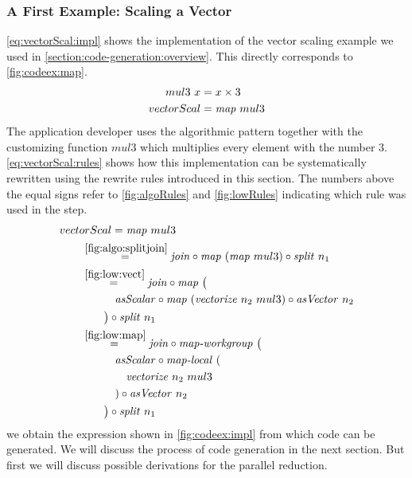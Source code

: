 \subsubsection{A First Example: Scaling a Vector}
\autoref{eq:vectorScal:impl} shows the implementation of the vector scaling example we used in \autoref{section:code-generation:overview}.
This directly corresponds to \autoref{fig:codeex:map}.
\begin{align}
  mul3\ x &= x \times 3\nonumber\\
  vectorScal &= \text{\textit{map}}\ mul3
  \label{eq:vectorScal:impl}
\end{align}
The application developer uses the algorithmic pattern \map together with the customizing function $mul3$ which multiplies every element with the number $3$.
\autoref{eq:vectorScal:rules} shows how this implementation can be systematically rewritten using the rewrite rules introduced in this section.
The numbers above the equal signs refer to \autoref{fig:algoRules} and \autoref{fig:lowRules} indicating which rule was used in the step.
\begin{align}
  &vectorScal = \text{\textit{map}}\ mul3\nonumber\\
  &\qquad\begin{aligned}
    &\overset{\ref{fig:algo:splitjoin}}{=\hspace{.2em}}
      \text{\textit{join}} \circ \text{\textit{map}}\ (\text{\textit{map}}\ mul3) \circ \text{\textit{split}}\ n_1\\
    &\overset{\ref{fig:low:vect}}{=\hspace{.2em}}
      \text{\textit{join}} \circ \text{\textit{map}}\ \big(\\
      &\qquad\quad \text{\textit{asScalar}} \circ \text{\textit{map}}\ (\text{\textit{vectorize}}\ n_2\ mul3) \circ \text{\textit{asVector}}\ n_2\\
      &\qquad\big) \circ \text{\textit{split}}\ n_1\\
    &\overset{\ref{fig:low:map}}{=\hspace{.2em}}
      \text{\textit{join}} \circ \text{\textit{map-workgroup}}\ \big(\\
      &\qquad\quad \text{\textit{asScalar}} \circ \text{\textit{map-local}}\ (\\
      &\qquad\qquad\text{\textit{vectorize}}\ n_2\ mul3\\
      &\qquad\quad) \circ \text{\textit{asVector}}\ n_2\\
      &\qquad\big) \circ \text{\textit{split}}\ n_1
  \end{aligned}
  \label{eq:vectorScal:rules}
\end{align}
 we obtain the expression shown in \autoref{fig:codeex:impl} from which \OpenCL code can be generated.
We will discuss the process of \OpenCL code generation in the next section.
But first we will discuss possible derivations for the parallel reduction.












